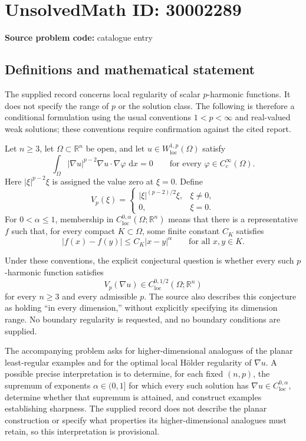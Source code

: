 \documentclass[11pt]{article}
\newcommand{\R}{\mathbb{R}}
\newcommand{\dd}{\,\mathrm{d}}
\begin{document}
\section*{UnsolvedMath ID: 30002289}
\textbf{Source problem code:} catalogue entry
\subsection{Definitions and mathematical statement}
The supplied record concerns local regularity of scalar \(p\)-harmonic functions. It does not specify the range of \(p\) or the solution class. The following is therefore a conditional formulation using the usual conventions \(1<p<\infty\) and real-valued weak solutions; these conventions require confirmation against the cited report.

Let \(n\geq 3\), let \(\Omega\subset\R^n\) be open, and let \(u\in W^{1,p}_{\mathrm{loc}}(\Omega)\) satisfy
\[
\int_\Omega |\nabla u|^{p-2}\nabla u\cdot\nabla\varphi\,\dd x=0
\qquad\text{for every }\varphi\in C_c^\infty(\Omega).
\]
Here \(|\xi|^{p-2}\xi\) is assigned the value zero at \(\xi=0\). Define
\[
V_p(\xi)=
\begin{cases}
|\xi|^{(p-2)/2}\xi,&\xi\neq0,\\
0,&\xi=0.
\end{cases}
\]
For \(0<\alpha\leq1\), membership in \(C^{0,\alpha}_{\mathrm{loc}}(\Omega;\R^n)\) means that there is a representative \(f\) such that, for every compact \(K\subset\Omega\), some finite constant \(C_K\) satisfies
\[
|f(x)-f(y)|\leq C_K|x-y|^\alpha
\qquad\text{for all }x,y\in K.
\]

Under these conventions, the explicit conjectural question is whether every such \(p\)-harmonic function satisfies
\[
V_p(\nabla u)\in C^{0,1/2}_{\mathrm{loc}}(\Omega;\R^n)
\]
for every \(n\geq3\) and every admissible \(p\). The source also describes this conjecture as holding ``in every dimension,'' without explicitly specifying its dimension range. No boundary regularity is requested, and no boundary conditions are supplied.

The accompanying problem asks for higher-dimensional analogues of the planar least-regular examples and for the optimal local H\"older regularity of \(\nabla u\). A possible precise interpretation is to determine, for each fixed \((n,p)\), the supremum of exponents \(\alpha\in(0,1]\) for which every such solution has \(\nabla u\in C^{0,\alpha}_{\mathrm{loc}}\), determine whether that supremum is attained, and construct examples establishing sharpness. The supplied record does not describe the planar construction or specify what properties its higher-dimensional analogues must retain, so this interpretation is provisional.
\end{document}
